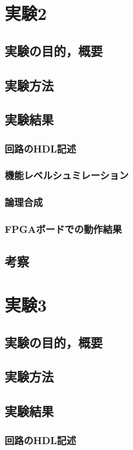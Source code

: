 \documentclass[a4paper,15pt]{jsarticle}
\begin{document}
\section{実験2}
\subsection{実験の目的，概要}
\subsection{実験方法}
\subsection{実験結果}
\subsubsection{回路のHDL記述}
\subsubsection{機能レベルシュミレーション}
\subsubsection{論理合成}
\subsubsection{FPGAボードでの動作結果}
\subsection{考察}

\section{実験3}
\subsection{実験の目的，概要}
\subsection{実験方法}
\subsection{実験結果}
\subsubsection{回路のHDL記述}
\end{document}
